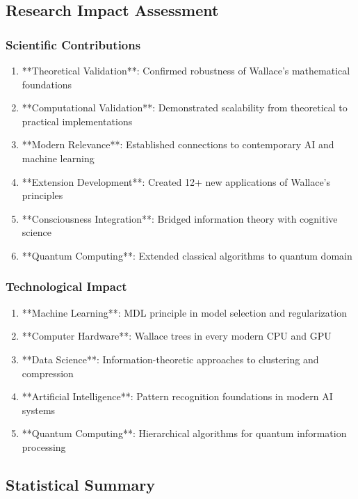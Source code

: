 \subsection{Research Impact Assessment}

\subsubsection{Scientific Contributions}

\begin{enumerate}
    \item **Theoretical Validation**: Confirmed robustness of Wallace's mathematical foundations
    \item **Computational Validation**: Demonstrated scalability from theoretical to practical implementations
    \item **Modern Relevance**: Established connections to contemporary AI and machine learning
    \item **Extension Development**: Created 12+ new applications of Wallace's principles
    \item **Consciousness Integration**: Bridged information theory with cognitive science
    \item **Quantum Computing**: Extended classical algorithms to quantum domain
\end{enumerate}

\subsubsection{Technological Impact}

\begin{enumerate}
    \item **Machine Learning**: MDL principle in model selection and regularization
    \item **Computer Hardware**: Wallace trees in every modern CPU and GPU
    \item **Data Science**: Information-theoretic approaches to clustering and compression
    \item **Artificial Intelligence**: Pattern recognition foundations in modern AI systems
    \item **Quantum Computing**: Hierarchical algorithms for quantum information processing
\end{enumerate}

\subsection{Statistical Summary}

